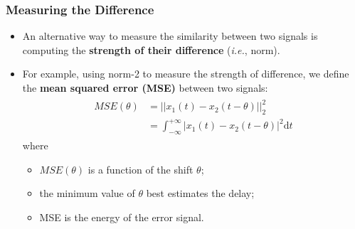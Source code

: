  
\subsubsection{Measuring the Difference}
\begin{itemize}
    \item An alternative way to measure the similarity between two signals is computing the \textbf{strength of their difference} (\textit{i.e.}, norm). 

    \item For example, using norm-2 to measure the strength of difference, we define the \textbf{mean squared error (MSE)} between two signals:
    \begin{align*} 
    \begin{split} 
        MSE(\theta) 
        &= \lvert \lvert x_{1}(t) - x_{2}(t-\theta) \rvert \rvert_{2}^{2}\\
        &=\int_{-\infty}^{+\infty} \lvert x_{1}(t) - x_{2}(t-\theta) \rvert^{2} \mathrm{d}t
    \end{split} 
    \end{align*}
    where
    \begin{itemize}
        \item $MSE(\theta)$ is a function of the shift $\theta$;
        \item the minimum value of $\theta$ best estimates the delay;
        \item MSE is the energy of the error signal.
    \end{itemize}
\end{itemize}
